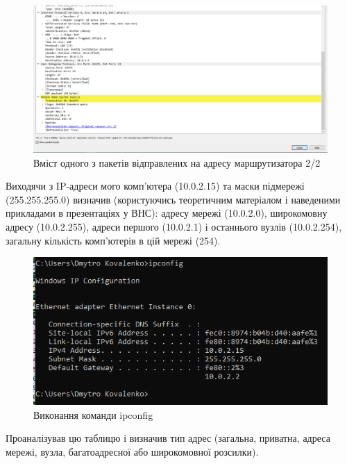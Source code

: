 \documentclass{article}
\begin{document}
\begin{normalsize}
\begin{figure}[H]
	\centering
	\includegraphics[width=\textwidth]{13}
	\caption{Вміст одного з пакетів відправлених на адресу маршрутизатора 2/2}
\end{figure}

Виходячи з IP-адреси мого комп'ютера (10.0.2.15) та маски підмережі (255.255.255.0) визначив (користуючись теоретичним матеріалом і наведеними прикладами в презентаціях у ВНС): адресу мережі (10.0.2.0), широкомовну адресу (10.0.2.255), адреси першого (10.0.2.1) і останнього вузлів (10.0.2.254), загальну кількість комп’ютерів в цій мережі (254).

\begin{figure}[H]
	\centering
	\includegraphics[width=\textwidth]{21}
	\caption{Виконання команди ipconfig}
\end{figure}

Проаналізував цю таблицю і визначив тип адрес (загальна, приватна, адреса мережі, вузла, багатоадресної або широкомовної розсилки).


\end{normalsize}
\end{document}

